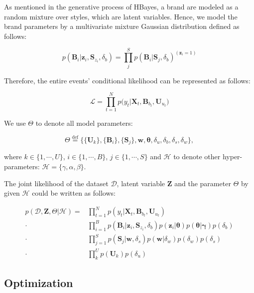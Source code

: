 As mentioned in the generative process of HBayes, a brand are modeled as a random mixture over styles, which are latent variables. Hence, we model the brand parameters by a multivariate mixture Gaussian distribution defined as follows:

\begin{equation}
p(\bm{B}_i|\bm{z}_i,\bm{S}_{z_i},\delta_b) = \prod_{j}^S p(\bm{B}_i|\bm{S}_j,\delta_b)^{(\bm{z}_i=1)}
\end{equation}


Therefore, the entire events' conditional likelihood can be represented as follows:

\begin{equation}
\mathcal{L} = \prod_{t=1}^N p\big(y_t|\bm{X}_t,\bm{B}_{b_t},\bm{U}_{u_t} \big)
\end{equation}

We use $\Theta$ to denote all model parameters:

\begin{equation}
\Theta \overset{\mathrm{def}}= \Big\{\{\bm{U}_k\}, \{\bm{B}_i\}, \{\bm{S}_j\}, \bm{w}, \boldsymbol{\theta}, \delta_u,\delta_b,\delta_s,\delta_w \Big\},
\end{equation}

\noindent where $k \in \{1, \cdots, U\}$, $i \in \{1, \cdots, B\}$, $j \in \{1, \cdots, S\}$ and $\mathcal{H}$ to denote other hyper-parameters: $\mathcal{H} = \{\gamma, \alpha,\beta\}$.


The joint likelihood of the dataset $\mathcal{D}$, latent variable $\bm{Z}$ and the parameter $\Theta$ by given $\mathcal{H}$ could be written as follows:

\begin{align}
  p(\mathcal{D},\bm{Z},\Theta|\mathcal{H})= & \prod_{t=1}^N p(y_t|\bm{X}_t,\bm{B}_{b_t},\bm{U}_{u_t})  \\ 
  \cdot &  \prod_{i=1}^B p(\bm{B}_i|\bm{z}_i,\bm{S}_{z_i},\delta_b) p(\bm{z}_{i}|\bm{\theta}) p(\bm{\theta}|\bm{\gamma}) p(\delta_b) \\
  \cdot & \prod_{j=1}^S p(\bm{S}_j|\bm{w},\delta_s) p(\bm{w}|\delta_w)p(\delta_w) p(\delta_s) \\
   \cdot & \prod_{k}^U p(\bm{U}_k) p(\delta_u) 
\label{joint_p}
\end{align}






\subsection{Optimization}

